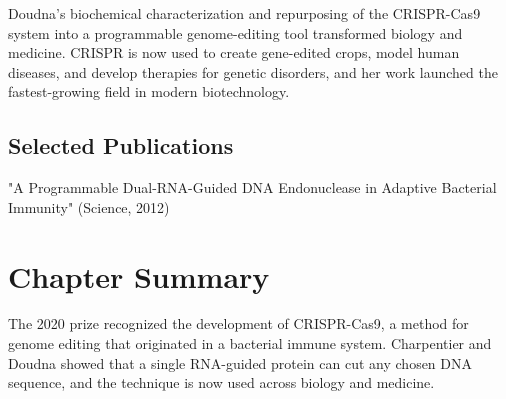 Doudna's biochemical characterization and repurposing of the CRISPR-Cas9 system into a programmable genome-editing tool transformed biology and medicine. CRISPR is now used to create gene-edited crops, model human diseases, and develop therapies for genetic disorders, and her work launched the fastest-growing field in modern biotechnology.

\subsection*{Selected Publications}

"A Programmable Dual-RNA-Guided DNA Endonuclease in Adaptive Bacterial Immunity" (Science, 2012)

\clearpage

\section*{Chapter Summary}

The 2020 prize recognized the development of CRISPR-Cas9, a method for genome editing that originated in a bacterial immune system. Charpentier and Doudna showed that a single RNA-guided protein can cut any chosen DNA sequence, and the technique is now used across biology and medicine.
